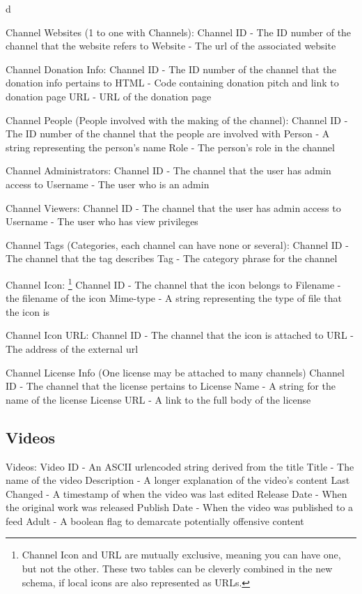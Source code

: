 d\documentclass[a4paper,12pt]{report}
\begin{document}
Channel Websites (1 to one with Channels):
	Channel ID - The ID number of the channel that the website refers to
	Website - The url of the associated website

Channel Donation Info:
	Channel ID - The ID number of the channel that the donation info pertains to
	HTML - Code containing donation pitch and link to donation page
	URL - URL of the donation page

Channel People (People involved with the making of the channel):
	Channel ID - The ID number of the channel that the people are involved with
	Person - A string representing the person's name
	Role - The person's role in the channel

Channel Administrators:
	Channel ID - The channel that the user has admin access to
	Username - The user who is an admin

Channel Viewers:
	Channel ID - The channel that the user has admin access to
	Username - The user who has view privileges

Channel Tags (Categories, each channel can have none or several):
	Channel ID - The channel that the tag describes
	Tag - The category phrase for the channel

Channel Icon:
\footnote{Channel Icon and URL are mutually exclusive, meaning you can have one, but not the other. These two tables can be cleverly combined in the new schema, if local icons are also represented as URLs.}
	Channel ID - The channel that the icon belongs to
	Filename - the filename of the icon
	Mime-type - A string representing the type of file that the icon is

Channel Icon URL:
	Channel ID - The channel that the icon is attached to
	URL - The address of the external url

Channel License Info (One license may be attached to many channels)
	Channel ID - The channel that the license pertains to
	License Name - A string for the name of the license
	License URL - A link to the full body of the license

\subsection{Videos}
Videos: 
	Video ID - An ASCII urlencoded string derived from the title
	Title - The name of the video
	Description - A longer explanation of the video's content
	Last Changed - A timestamp of when the video was last edited
	Release Date - When the original work was released
	Publish Date - When the video was published to a feed
	Adult - A boolean flag to demarcate potentially offensive content	
\end{document}
